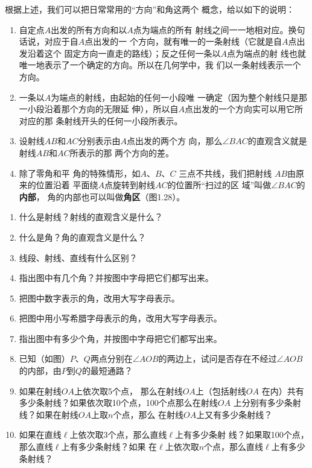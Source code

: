 根据上述，我们可以把日常常用的“方向”和角这两个
概念，给以如下的说明：
\begin{enumerate}
\item 自定点$A$出发的所有方向和以$A$点为端点的所有
射线之间一一地相对应。换句话说，对应于自$A$点出发的一
个方向，就有唯一的一条射线（它就是自$A$点出发沿着这个
固定方向一直走的路线）；反之任何一条以$A$点为端点的射
线也就唯一地表示了一个确定的方向。所以在几何学中，我
们以一条射线表示一个方向。
\item 一条以$A$为端点的射线，由起始的任何一小段唯
一确定（因为整个射线只是那一小段沿着那个方向的无限延
伸），所以自$A$点出发的一个方向实可以用它所对应的那
条射线开头的任何一小段所表示。
\item 设射线$AB$和$AC$分别表示由$A$点出发的两个方
向，那么$\angle BAC$的直观含义就是射线$AB$和$AC$所表示的那
两个方向的差。
\item 除了零角和平
角的特殊情形，如$A$、$B$、$C$
三点不共线，我们把射线
$AB$由原来的位置沿着
平面绕$A$点旋转到射线$AC$的位置所“扫过的区
域”叫做$\angle BAC$的\textbf{内部}，
角的内部也可以叫做\textbf{角区}（图1.28）。
\end{enumerate}

\begin{ex}
\begin{enumerate}
	\item 什么是射线？射线的直观含义是什么？
	\item 什么是角？角的直观含义是什么？
	\item 线段、射线、直线有什么区别？
	\item 指出图中有几个角？并按图中字母把它们都写出来。
	\item 把图中数字表示的角，改用大写字母表示。
	\item 把图中用小写希腊字母表示的角，改用大写字母表示。
	\item 指出图中有多少个角，并按图中字母把它们都写出来。
	\item 已知（如图）$P$、$Q$两点分别在$\angle AOB$的两边上，试问是否存在不经过$\angle AOB$的内部，由$	P$到$Q$的最短通路？
	\item 如果在射线$OA$上依次取5个点，
	那么在射线$OA$上（包括射线$OA$
	在内）共有多少条射线？如果依次取10个点，100个点那么在射线$OA$
	上分别有多少条射线？如果在射线$OA$上取$n$个点，那么
在射线$OA$上又有多少条射线？
\item 如果在直线$\ell$上依次取3个点，那么直线$\ell$上有多少条射
线？如果取100个点，那么直线$\ell$上有多少条射线？如果
在$\ell$上依次取$n$个点，那么直线$\ell$上有多少条射线？
\end{enumerate}
\end{ex}

